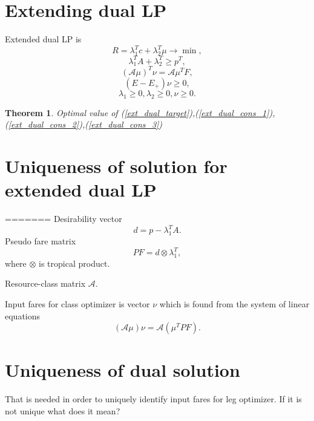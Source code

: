 \documentclass[a4paper,oneside]{article}
\newtheorem{theo}{Theorem}
\begin{document}
\section{Extending dual LP}
Extended dual LP is
\begin{equation}
R = \lambda_1^T c + \lambda_2^T \mu \longrightarrow \min,
\label{ext_dual_target}
\end{equation}
\begin{equation}
\lambda_1^T A + \lambda_2^T \geq p^T,
\label{ext_dual_cons_1}
\end{equation}
\begin{equation}
(\mathcal{A}\mu)^T \nu = \mathcal{A} \mu^T F,
\label{ext_dual_cons_2}
\end{equation}
\begin{equation}
(E - E_+) \nu \geq 0,
\end{equation}
\begin{equation}
\lambda_1\geq 0, \lambda_2 \geq 0, \nu \geq 0.
\label{ext_dual_cons_3}
\end{equation}

\begin{theo}
Optimal value of 
(\ref{ext_dual_target}),(\ref{ext_dual_cons_1}),(\ref{ext_dual_cons_2}),(\ref{ext_dual_cons_3})
\end{theo}

\section{Uniqueness of solution for extended dual LP}
=======
Desirability vector
$$
d = p - \lambda_1^T A.
$$
Pseudo fare matrix
$$
PF = d \otimes \lambda_1^T,
$$
where $\otimes$ is tropical product.

Resource-class matrix $\mathcal{A}$.

Input fares for class optimizer is vector $\nu$ which is found from 
the system of linear equations
$$
(\mathcal{A}\mu)\nu = \mathcal{A}(\mu^T PF).
$$


\section{Uniqueness of dual solution}
That is needed in order to uniquely identify input fares for leg optimizer.
If it is not unique what does it mean?
\end{document}
